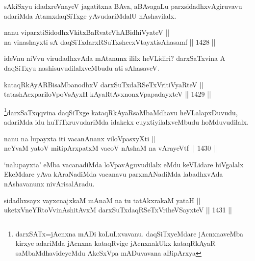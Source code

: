 \begin{artha}
sAkiSxyu idadxreVnayeV jagatitxna BAva, aBAvagaLu parxsidadhxvAgiruvavu adariMda AtamxdaqSiTxge yAvudariMdalU nAshavilalx.
\end{artha}


\begin{shl}
nanu viparxtiSidodhxVkitxBaRvateVhABidhiVyateV || \\
na vinashayxti sA daqSiTxdarxRSuTxshecxVtayxtisAhasamf \hfill || 1428 ||  
\end{shl}

\begin{artha}
ideVnu niVvu virudadhxvAda mAtanunx ililx heVLidiri? darxSaTxvina A daqSiTxyu nashisuvudilalxveMbudu ati sAhasaveV.
\end{artha}


\begin{shl}
kataqRkAyARBisaMbanodhxV darxSuTxdaRSeTxVritiVyaRteV || \\
tatashAcxpariloVpoV\s sAyxH kAyaRtAvxnonxVpapadayxteV \hfill || 1429 ||  
\end{shl}

\begin{artha}
\footnote{darxSATx=jAcnxna mADi koLuLxvavanu. daqSiTxyeMdare jAcnxnaveMba kirxye adariMda jAcnxna kataqRvige jAcnxnakUkx kataqRkAyaR saMbaMdhavideyeMdu AkeSxVpa mADuvavana aBipArxya}darxSaTxqqvina daqSiTxge kataqRkAyaRsaMbaMdhavu heVLalapxDuvudu, adariMda idu huTiTxruvudariMda idakekx cuyxtiyilalxveMbudu hoMduvudilalx.
\end{artha}


\begin{shl}
nanu na lupayxta iti vacanAnanx viloVpasxyXti || \\
neYvaM yatoV mitipArxpatxM vacoV nAshaM na vArayeVtf \hfill || 1430 ||  
\end{shl}

\begin{artha}
`nalupayxta' eMba vacanadiMda loVpavAguvudilalx eMdu keVLidare hiVgalalx EkeMdare yAva kAraNadiMda vacanavu parxmANadiMda labadhxvAda nAshavanunx nivArisalAradu.
\end{artha}


\begin{shl}
sidadhxsayx vayxcnajxkaM mAnaM na tu tatAkxrakaM yataH || \\
uketxVneYRtoV\s vinAshitAvxM darxSuTxdaqRSeTxVriheVSayxteV \hfill || 1431 ||  
\end{shl}

